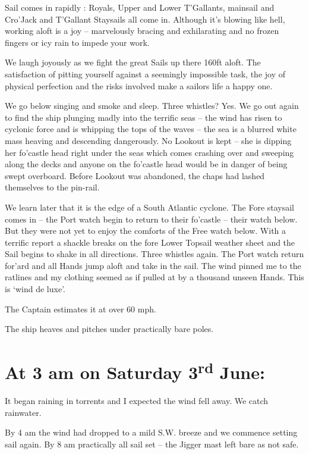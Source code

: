 \documentclass[
  11pt,
  msmallroyalvopaper
]{memoir}
\begin{document}
Sail comes in rapidly : Royals, Upper and Lower T'Gallants, mainsail and
Cro'Jack and T'Gallant Staysails all come in. Although it's blowing like
hell, working aloft is a joy -- marvelously bracing and exhilarating and
no frozen fingers or icy rain to impede your work.

We laugh joyously as we fight the great Sails up there 160ft aloft. The
satisfaction of pitting yourself against a seemingly impossible task,
the joy of physical perfection and the risks involved make a sailors
life a happy one.

We go below singing and smoke and sleep. Three whistles? Yes. We go out
again to find the ship plunging madly into the terrific seas -- the wind
has risen to cyclonic force and is whipping the tops of the waves -- the
sea is a blurred white mass heaving and descending dangerously. No
Lookout is kept -- she is dipping her fo'castle head right under the
seas which comes crashing over and sweeping along the decks and anyone
on the fo'castle head would be in danger of being swept overboard.
Before Lookout was abandoned, the chaps had lashed themselves to the
pin-rail.

We learn later that it is the edge of a South Atlantic cyclone. The Fore
staysail comes in -- the Port watch begin to return to their fo'castle
-- their watch below. But they were not yet to enjoy the comforts of the
Free watch below. With a terrific report a shackle breaks on the fore
Lower Topsail weather sheet and the Sail begins to shake in all
directions. Three whistles again. The Port watch return for'ard and all
Hands jump aloft and take in the sail. The wind pinned me to the
ratlines and my clothing seemed as if pulled at by a thousand unseen
Hands. This is `wind de luxe'.

The Captain estimates it at over 60 mph.

The ship heaves and pitches under practically bare poles.

\hypertarget{at-3-am-on-saturday-3rd-june}{%
\section{\texorpdfstring{At 3 am on Saturday 3\textsuperscript{rd}
June:}{At 3 am on Saturday 3rd June:}}\label{at-3-am-on-saturday-3rd-june}}

It began raining in torrents and I expected the wind fell away. We catch
rainwater.

By 4 am the wind had dropped to a mild S.W. breeze and we commence
setting sail again. By 8 am practically all sail set -- the Jigger mast
left bare as not safe.
\end{document}

